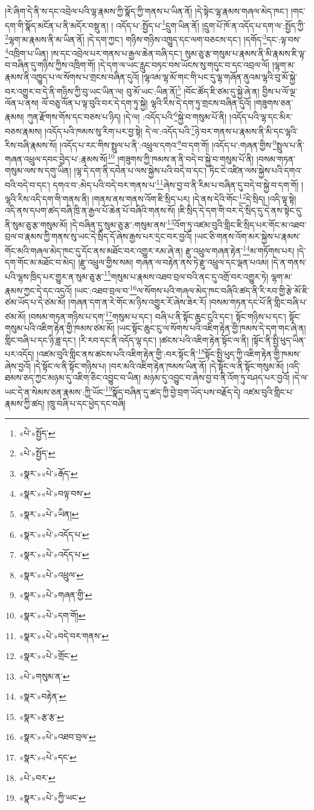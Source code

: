 །རེ་ཞིག་དེ་ནི་ས་དང་འབྲེལ་པའི་ལྷ་རྣམས་ཀྱི་སྣོད་ཀྱི་གནས་པ་ཡིན་ནོ། །དེ་སྟེང་ལྷ་རྣམས་གཞལ་མེད་ཁང་། །གང་དག་གི་སྣོད་མངོན་པ་ནི་མདོར་བསྡུ་ན། །
འདོད་པ་:སྤྱོད་པ་\footnote{«པེ་»སྤྱོད་}དྲུག་ཡིན་ནོ། །དྲུག་པོ་ཁོ་ན་འདོད་པ་དག་ལ་:སྤྱོད་ཀྱི་\footnote{«པེ་»སྤྱོད་}ལྷག་མ་རྣམས་ནི་མ་ཡིན་ནོ། །དེ་དག་ཀྱང་། གཉིས་གཉིས་འཁྱུད་དང་ལག་བཅངས་དང་། །དགོད་\footnote{«སྣར་»«པེ་»རྒོད་}དང་:ལྟ་བས་\footnote{«སྣར་»«པེ་»བལྟ་བས་}འཁྲིག་པ་ཡིན། །ས་དང་འབྲེལ་པར་གནས་པ་རྒྱལ་ཆེན་བཞི་དང་། སུམ་ཅུ་རྩ་གསུམ་པ་རྣམས་ནི་མི་རྣམས་ཇི་ལྟ་བ་བཞིན་དུ་གཉིས་ཀྱིས་འཁྲིག་གོ། །དེ་དག་ལ་ཡང་རླུང་བཏང་བས་ཡོངས་སུ་གདུང་བ་དང་འབྲལ་ལོ། །ལྷག་མ་རྣམས་ནི་འཁྱུད་པ་ལ་སོགས་པ་གྲངས་བཞིན་དུའོ། །ལྷའམ་ལྷ་མོ་གང་གི་པང་དུ་ལྷ་གཞོན་ནུའམ་ལྷའི་བུ་མོ་སྐྱེ་བར་འགྱུར་བ་དེ་ནི་གཉིས་ཀྱི་བུ་ཡང་ཡིན་ལ། བུ་མོ་ཡང་:ཡིན་ནོ།\footnote{«སྣར་»«པེ་»ཡིན།} །བོང་ཚོད་ཇི་ཙམ་དུ་སྐྱེ་ཞེ་ན། བྱིས་པ་ལོ་ལྔ་ལོན་པ་ནས། ལོ་བཅུ་ལོན་པ་ལྟ་བུའི་བར་དེ་དག་ཏུ་སྐྱེ། ལྷའི་རིས་དེ་དག་ཏུ་གྲངས་བཞིན་དུའོ། །གཟུགས་ཅན་རྣམས། ཀུན་རྫོགས་གོས་དང་བཅས་པ་ཉིད། །དེ་ལ། :འདོད་པའི་\footnote{«སྣར་»«པེ་»འདོད་པ་}སྐྱེ་བ་གསུམ་པོ་ནི། །འདོད་པའི་ལྷ་དང་མིར་བཅས་རྣམས། །འདོད་པའི་ཁམས་སུ་རིག་པར་བྱ་སྟེ། དེ་ལ་:འདོད་པའི་\footnote{«སྣར་»«པེ་»འདོད་པ་}ཉེ་བར་གནས་པ་རྣམས་ནི་མི་དང་ལྷའི་རིས་བཞི་རྣམས་སོ། །འདོད་པ་རང་གིས་སྤྲུལ་པ་ནི་:འཕྲུལ་དགའ་\footnote{«སྣར་»«པེ་»འཕྲུལ་}བ་དག་གོ། །འདོད་པ་:གཞན་གྱིས་\footnote{«སྣར་»«པེ་»གཞན་གྱི་}སྤྲུལ་པ་ནི་གཞན་འཕྲུལ་དབང་བྱེད་པ་:རྣམས་སོ།\footnote{«སྣར་»«པེ་»དག་གོ།} །གཟུགས་ཀྱི་ཁམས་ན་ནི་བདེ་བ་སྐྱེ་བ་གསུམ་པོ་ནི། །བསམ་གཏན་གསུམ་ལས་ས་དགུ་ཡིན། །ལྷ་དེ་དག་ནི་དབེན་པ་ལས་སྐྱེས་པའི་བདེ་བ་དང་། ཏིང་ངེ་འཛིན་ལས་སྐྱེས་པའི་དགའ་བའི་བདེ་བ་དང་། དགའ་བ་:མེད་པའི་བདེ་བར་གནས་པ་\footnote{«སྣར་»«པེ་»བདེ་བར་གནས་}ཞེས་བྱ་བ་ནི་རིམ་པ་བཞིན་དུ་བདེ་བ་སྐྱེ་བ་དག་གོ། །ལྷའི་རིས་འདི་དག་གི་གནས་ནི། །གནས་ནས་གནས་འོག་ཇི་སྲིད་པར། །དེ་ནས་དེའི་གོང་\footnote{«སྣར་»«པེ་»གྲོང་}དེ་སྲིད། །འདི་ལྟ་སྟེ། འདི་ནས་དཔག་ཚད་བཞི་ཁྲི་ན་རྒྱལ་པོ་ཆེན་པོ་བཞིའི་གནས་སོ། །ཇི་སྲིད་དེ་དག་གི་བར་དེ་སྲིད་དུ་དེ་ནས་སྟེང་དུ་ནི་སུམ་ཅུ་རྩ་གསུམ་མོ། །དེ་བཞིན་དུ་སུམ་ཅུ་རྩ་:གསུམ་ནས་\footnote{«པེ་»གསུམ་ན་}འོག་ཏུ་འཛམ་བུའི་གླིང་ཇི་སྲིད་པར་གོང་མ་འཐབ་བྲལ་བ་རྣམས་ཀྱི་གནས་སུ་ཡང་དེ་སྲིད་དོ་ཞེས་རྒྱས་པར་དྲང་བར་བྱའོ། །ཡང་ཅི་གནས་འོག་མར་སྐྱེས་པ་རྣམས་གོང་མའི་གཞལ་མེད་ཁང་དུ་དོང་ནས་མཐོང་བར་འགྱུར་རམ་ཞེ་ན། རྫུ་འཕྲུལ་གཞན་རྟེན་\footnote{«སྣར་»བརྟེན་}མ་གཏོགས་པར། །དེ་དག་གོང་མ་མཐོང་བ་མེད། །རྫུ་འཕྲུལ་གྱིས་སམ། གཞན་ལ་བརྟེན་ནས་ཏེ་རྫུ་འཕྲུལ་དང་ལྡན་པའམ། །དེ་ན་གནས་པའི་ལྷས་ཁྲིད་པར་གྱུར་ན་སུམ་ཅུ་རྩ་\footnote{«སྣར་»རྩ་རྩ་}གསུམ་པ་རྣམས་འཐབ་བྲལ་བའི་ནང་དུ་འགྲོ་བར་འགྱུར་ཏེ། ལྷག་མ་རྣམས་ཀྱང་དེ་དང་འདྲའོ། །ཡང་:འཐབ་བྲལ་བ་\footnote{«སྣར་»«པེ་»འཐབ་བྲལ་}ལ་སོགས་པའི་གཞལ་མེད་ཁང་བཞིའི་ཚད་ནི་རི་རབ་གྱི་རྩེ་མོ་ཇི་ཙམ་ཡོད་པ་དེ་ཙམ་མོ། །གཞན་དག་ན་རེ་གོང་མ་ཉིས་འགྱུར་རོ་ཞེས་ཟེར་རོ། །བསམ་གཏན་དང་པོ་ནི་གླིང་བཞི་པ་ཙམ་མོ། །བསམ་གཏན་གཉིས་པ་དག་\footnote{«སྣར་»«པེ་»དང་}གསུམ་པ་དང་། བཞི་པ་ནི་སྟོང་ཆུང་ངུའི་དང་། སྟོང་གཉིས་པ་དང་། སྟོང་གསུམ་པའི་འཇིག་རྟེན་གྱི་ཁམས་ཙམ་མོ། །ཡང་སྟོང་ཆུང་ངུ་ལ་སོགས་པའི་འཇིག་རྟེན་གྱི་ཁམས་དེ་དག་གང་ཞེ་ན། གླིང་བཞི་པ་དང་ཉི་ཟླ་དང་། །རི་རབ་དང་ནི་འདོད་ལྷ་དང་། །ཚངས་པའི་འཇིག་རྟེན་སྟོང་ལ་ནི། །སྟོང་ནི་སྤྱི་ཕུད་ཡིན་པར་འདོད། །འཛམ་བུའི་གླིང་ནས་ཚངས་པའི་འཇིག་རྟེན་གྱི་:བར་སྟོང་ནི་\footnote{«པེ་»བར་}སྟོང་སྤྱི་ཕུད་ཀྱི་འཇིག་རྟེན་གྱི་ཁམས་ཞེས་བྱའོ། །དེ་སྟོང་ལ་ནི་སྟོང་གཉིས་པ། །བར་མའི་འཇིག་རྟེན་ཁམས་ཡིན་ནོ། །དེ་སྟོང་ལ་ནི་སྟོང་གསུམ་མོ། །འདི་ཐམས་ཅད་ཀྱང་མཉམ་དུ་འཇིག་ཅིང་འབྱུང་བ་ཡིན། མཉམ་དུ་འབྱུང་བ་ཞེས་བྱ་བ་ནི་འོག་ཏུ་བཤད་པར་བྱའོ། །དེ་ལ་ཡང་དེ་ན་སེམས་ཅན་རྣམས་:ཀྱི་ཡོང་\footnote{«སྣར་»«པེ་»ཀྱི་ཡང་}སྣོད་བཞིན་དུ་ཚད་ཀྱི་བྱེ་བྲག་ཡོད་པས་བརྗོད་དེ། འཛམ་བུའི་གླིང་པ་རྣམས་ཀྱི་ཚད། །ཁྲུ་བཞི་པ་དང་ཕྱེད་དང་བཞི། 